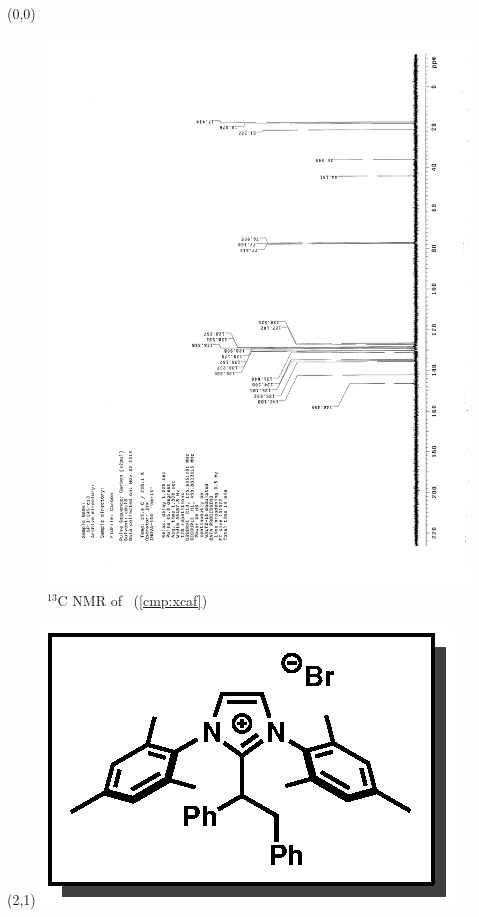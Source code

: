 \clearpage
\begin{textblock}{20}(0,0)
\begin{figure}[htb]
\caption{$^{13}$C NMR of  \CMPxcaf\ (\ref{cmp:xcaf})}
\includegraphics[scale=0.75, trim = 0mm 0mm 0mm 5mm,
clip]{chp_alkylation/images/nmr/xcafC}
\vspace{-100pt}
\end{figure}
\end{textblock}
\begin{textblock}{1}(2,1)
\includegraphics[scale=0.8, angle=90]{chp_alkylation/images/xcaf}
\end{textblock}
\clearpage

